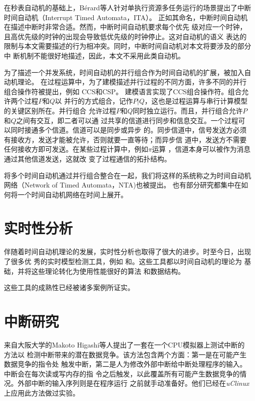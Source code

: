 在秒表自动机的基础上，B{\'e}rard等人针对单执行资源多任务运行的场景提出了中断
时间自动机（Interrupt Timed Automata，ITA）。\cite{Berard:2012:ITA:2158996.2159045}
正如其命名，中断时间自动机在描述中断时非常合适。然而，中断时间自动机要求每个优先
级对应一个时钟，且高优先级的时钟的出现会导致低优先级的时钟停止。这对自动机的语义
表达的限制与本文需要描述的行为相冲突。同时，中断时间自动机对本文将要涉及的部分中
断机制不能很好地描述，因此，本文不采用此类自动机。

为了描述一个并发系统，时间自动机的并行组合作为时间自动机的扩展，被加入自动机理论。
在过程运算中，为了建模描述并行过程的不同方面，许多不同的并行组合操作符被提出，例如
CCS\cite{Milner:1989:CC:534666}和CSP\cite{Hoare:1978:CSP:359576.359585}。\uppaal 
建模语言\cite{Larsen97uppaalin}实现了CCS组合操作符。组合允许两个过程$P$和$Q$以
并行的方式组合，记作$P|Q$，这也是过程运算与串行计算模型的关键区别所在。并行组合
允许过程$P$和$Q$同时独立运行。而且，并行组合允许$P$和$Q$之间有交互，即二者可以通
过共享的信道进行同步和信息交互。一个过程可以同时接通多个信道。信道可以是同步或异步
的。同步信道中，信号发送方必须有接收方，发送才能被允许，否则就要一直等待；而异步信
道中，发送方不需要任何接收方即可发送。在某些过程计算中，例如$\pi$运算
\cite{Sangiorgi:2001:PTM:559050}，信道本身可以被作为消息通过其他信道发送，这就改
变了过程通信的拓扑结构。

将多个时间自动机通过并行组合整合在一起，我们将这样的系统称之为时间自动机网络（Network 
of Timed Automata，NTA)也被提出。\cite{Alur:1994:TTA:180782.180519,Bouyer06timedunfoldings}
也有部分研究都集中在如何将一个时间自动机网络在时间上展开。\cite{Bouyer06timedunfoldings}

\section{实时性分析}
\label{sec:timing_study}

伴随着时间自动机理论的发展，实时性分析也取得了很大的进步。时至今日，出现了很多优
秀的实时模型检测工具，例如\uppaal \cite{Behrmann04atutorial, Larsen97efficientverification}
和\cite{Yovine97kronos:a}。这些工具都以时间自动机的理论为
基础，并将这些理论转化为使用性能很好的算法
\cite{Behrmann:2002:UIS:646847.707113, Behrmann:2006:LUB:1165374.1165376, BehrmannHV00, Behrmann:to}
和数据结构\cite{Behrmann98efficienttimed, Larsen97efficientverification, Larsen:1999:CDD:774455.774459}。

这些工具的成熟性已经被诸多案例所证实。\cite{D'Argenio:1997:BRP:646481.691445,Ernits:2005:MAS:1124427.1124429,Hen05a,Jensen:2000:SUU:646846.706958,Lamport:2005:RMC:2156375.2156396,Larsen:2005:TRE:1086228.1086283,Lindahl:1998:FDA:646482.691449}

\section{中断研究}
\label{sec:intr_study}
来自大阪大学的Makoto Higashi等人提出了一套在一个CPU模拟器上测试中断的方法以
检测中断带来的潜在数据竞争。该方法包含两个方面：第一是在可能产生数据竞争的指令处
触发中断，第二是人为修改外部中断给中断处理程序的输入。中断会在每次读或写内存的指
令之后触发，以此覆盖所有可能产生数据竞争的情况。外部中断的输入序列则是在程序运行
之前就手动准备好。他们已经在\emph{uClinux}上应用此方法做过实验。\cite{Higashi:2010:EMC:1808266.1808278}

